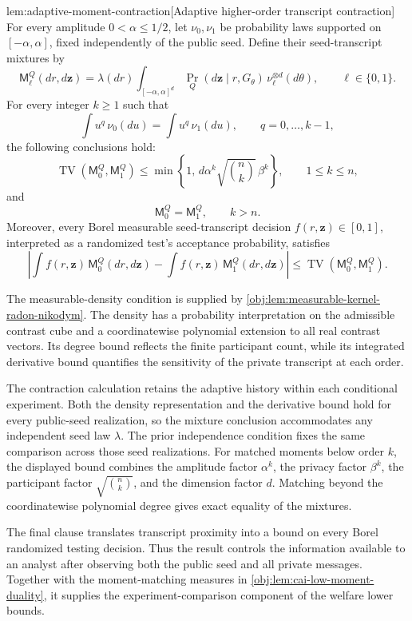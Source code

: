 \begin{lemmav}{lem:adaptive-moment-contraction}[Adaptive higher-order transcript contraction]
For every amplitude \(0<\alpha\le1/2\), let \(\nu_0,\nu_1\) be probability laws supported on \([-\alpha,\alpha]\), fixed independently of the public seed. Define their seed-transcript mixtures by
\[
\mathsf M_\ell^Q(dr,d\mathbf z)
=
\lambda(dr)
\int_{[-\alpha,\alpha]^d}
\Pr_Q(d\mathbf z\mid r,G_\theta)\,
\nu_\ell^{\otimes d}(d\theta),
\qquad \ell\in\{0,1\}.
\]
For every integer \(k\ge1\) such that
\[
\int u^q\,\nu_0(du)=\int u^q\,\nu_1(du),
\qquad q=0,\ldots,k-1,
\]
the following conclusions hold:
\[
\operatorname{TV}(\mathsf M_0^Q,\mathsf M_1^Q)
\le
\min\left\{1,\,
d\alpha^k\sqrt{\binom nk}\,\beta^k\right\},
\qquad 1\le k\le n,
\]
and
\[
\mathsf M_0^Q=\mathsf M_1^Q,
\qquad k>n.
\]
Moreover, every Borel measurable seed-transcript decision \(f(r,\mathbf z)\in[0,1]\), interpreted as a randomized test's acceptance probability, satisfies
\[
\left|
\int f(r,\mathbf z)\,\mathsf M_0^Q(dr,d\mathbf z)
-
\int f(r,\mathbf z)\,\mathsf M_1^Q(dr,d\mathbf z)
\right|
\le
\operatorname{TV}(\mathsf M_0^Q,\mathsf M_1^Q).
\]
\end{lemmav}

The measurable-density condition is supplied by \cref{obj:lem:measurable-kernel-radon-nikodym}. The density has a probability interpretation on the admissible contrast cube and a coordinatewise polynomial extension to all real contrast vectors. Its degree bound reflects the finite participant count, while its integrated derivative bound quantifies the sensitivity of the private transcript at each order.

The contraction calculation retains the adaptive history within each conditional experiment. Both the density representation and the derivative bound hold for every public-seed realization, so the mixture conclusion accommodates any independent seed law \(\lambda\). The prior independence condition fixes the same comparison across those seed realizations. For matched moments below order \(k\), the displayed bound combines the amplitude factor \(\alpha^k\), the privacy factor \(\beta^k\), the participant factor \(\sqrt{\binom nk}\), and the dimension factor \(d\). Matching beyond the coordinatewise polynomial degree gives exact equality of the mixtures.

The final clause translates transcript proximity into a bound on every Borel randomized testing decision. Thus the result controls the information available to an analyst after observing both the public seed and all private messages. Together with the moment-matching measures in \cref{obj:lem:cai-low-moment-duality}, it supplies the experiment-comparison component of the welfare lower bounds.


